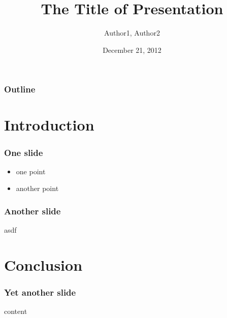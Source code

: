 \documentclass[t,12pt,pdftex]{beamer}
\title{The Title of Presentation}
\author{Author1, Author2}
\institute{University of Helsinki\\Department of Computer Science}
\date{December 21, 2012}
\begin{document}

\HyTitle

\begin{frame}
	\frametitle{Outline}
	\tableofcontents
\end{frame}



\section{Introduction}

\begin{frame}
	\frametitle{One slide}
	
	\begin{itemize}
		\item one point
		\item another point
	\end{itemize}
\end{frame}

\begin{frame}
	\frametitle{Another slide}
	
	asdf
\end{frame}

\section{Conclusion}

\begin{frame}
	\frametitle{Yet another slide}
	
	content
\end{frame}
\end{document}
